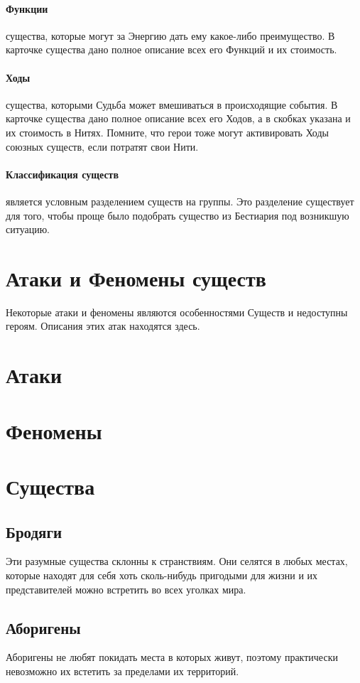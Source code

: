 \paragraph{Функции} существа, которые могут за Энергию дать ему какое-либо преимущество. В карточке существа дано полное описание всех его Функций и их стоимость.
\paragraph{Ходы} существа, которыми Судьба может вмешиваться в происходящие события. В карточке существа дано полное описание всех его Ходов, а в скобках указана и их стоимость в Нитях. Помните, что герои тоже могут активировать Ходы союзных существ, если потратят свои Нити.
\paragraph{Классификация существ} является условным разделением существ на группы. Это разделение существует для того, чтобы проще было подобрать существо из Бестиария под возникшую ситуацию.

\section{Атаки и Феномены существ}
Некоторые атаки и феномены являются особенностями Существ и недоступны героям. Описания этих атак находятся здесь.
\section{Атаки}
\section{Феномены}

\section{Существа}
\subsection{Бродяги}
Эти разумные существа склонны к странствиям. Они селятся в любых местах, которые находят для себя хоть сколь-нибудь пригодыми для жизни и их представителей можно встретить во всех уголках мира.

\subsection{Аборигены}
Аборигены не любят покидать места в которых живут, поэтому практически невозможно их встетить за пределами их территорий.

